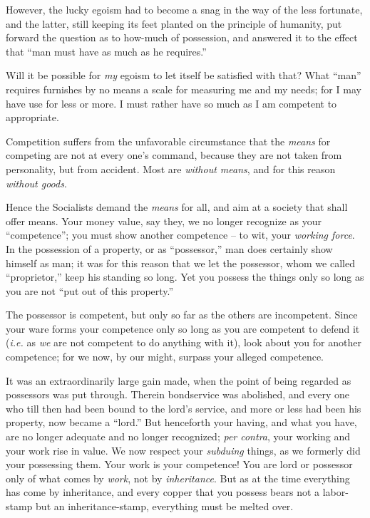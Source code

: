 However, the lucky egoism had to become a snag in the way of the less 
fortunate, and the latter, still keeping its feet planted on the principle of 
humanity, put forward the question as to how-much of possession, and answered 
it to the effect that ``man must have as much as he requires.''

Will it be possible for \textit{my} egoism to let itself be satisfied with 
that? What ``man'' requires furnishes by no means a scale for measuring me 
and my needs; for I may have use for less or more. I must rather have so much 
as I am competent to appropriate.

Competition suffers from the unfavorable circumstance that the \textit{means} 
for competing are not at every one's command, because they are not taken from 
personality, but from accident. Most are \textit{without means}, and for this 
reason \textit{without goods}.

Hence the Socialists demand the \textit{means} for all, and aim at a society 
that shall offer means. Your money value, say they, we no longer recognize as 
your ``competence''; you must show another competence -- to wit, your 
\textit{working force}. In the possession of a property, or as 
``possessor,'' man does certainly show himself as man; it was for this 
reason that we let the possessor, whom we called ``proprietor,'' keep his 
standing so long. Yet you possess the things only so long as you are not 
``put out of this property.''

The possessor is competent, but only so far as the others are incompetent. 
Since your ware forms your competence only so long as you are competent to 
defend it (\textit{i.e.} as \textit{we} are not competent to do anything with 
it), look about you for another competence; for we now, by our might, surpass 
your alleged competence.

It was an extraordinarily large gain made, when the point of being regarded as 
possessors was put through. Therein bondservice was abolished, and every one 
who till then had been bound to the lord's service, and more or less had been 
his property, now became a ``lord.'' But henceforth your having, and what 
you have, are no longer adequate and no longer recognized; \textit{per 
contra}, your working and your work rise in value. We now respect your 
\textit{subduing} things, as we formerly did your possessing them. Your work 
is your competence! You are lord or possessor only of what comes by 
\textit{work}, not by \textit{inheritance}. But as at the time everything has 
come by inheritance, and every copper that you possess bears not a labor-stamp 
but an inheritance-stamp, everything must be melted over.


